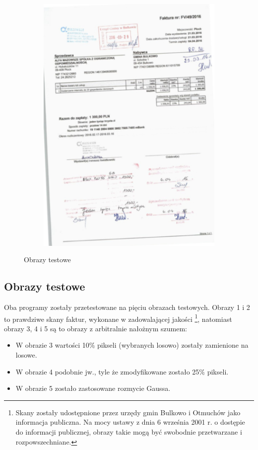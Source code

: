 \documentclass[10pt]{article} %
\begin{document}
\begin{figure}
\begin{subfigure}{\linewidth}
  \includegraphics[width=.33\linewidth]{testing/ALFA-gauss.jpg}\hfill
  \end{subfigure}
  \caption{Obrazy testowe} \label{fig:testowe}
\end{figure}


\subsection{Obrazy testowe}

Oba programy zostały przetestowane na pięciu obrazach testowych. Obrazy 1 i 2 to prawdziwe skany faktur, wykonane w zadowalającej jakości \footnote{Skany zostały udostępnione przez urzędy gmin Bulkowo i Otmuchów jako informacja publiczna. Na mocy ustawy z dnia 6 września 2001 r. o dostępie do informacji publicznej, obrazy takie mogą być swobodnie przetwarzane i rozpowszechniane.}, natomiast obrazy 3, 4 i 5 są to obrazy z arbitralnie nałożnym szumem:
\begin{itemize}
\item W obrazie 3 wartości 10\% pikseli (wybranych losowo) zostały zamienione na losowe.
\item W obrazie 4 podobnie jw., tyle że zmodyfikowane zostało 25\% pikseli.
\item W obrazie 5 zostało zastosowane rozmycie Gaussa.
\end{itemize}
\end{document}
